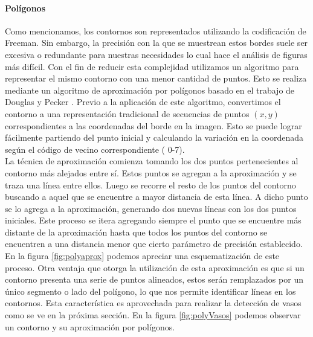 		
	\paragraph{Polígonos}
	Como mencionamos, los contornos son representados utilizando la codificación de Freeman. Sin embargo, la precisión con la que se muestrean estos bordes suele ser excesiva o redundante para nuestras
	necesidades lo cual hace el análisis de figuras más difícil. Con el fin de reducir esta complejidad utilizamos un algoritmo
	para representar el mismo contorno con una menor cantidad de puntos. Esto se realiza mediante un algoritmo de aproximación por polígonos
	basado en el trabajo de Douglas y Pecker \cite{dp74}. Previo a la aplicación de este algoritmo, convertimos el contorno a una representación
	tradicional de secuencias de puntos $(x,y)$ correspondientes a las 
	coordenadas del borde en la imagen. Esto se puede lograr fácilmente partiendo del punto inicial y calculando la variación en la coordenada según el código de vecino correspondiente ( 0-7).\\
	\indent La técnica de aproximación comienza tomando los dos puntos 
	pertenecientes al contorno más alejados entre sí. Estos puntos se 
	agregan a la aproximación y se traza una línea entre ellos.
	Luego se recorre el resto de los puntos del contorno buscando a aquel 
	que se encuentre a mayor distancia de esta línea. A dicho punto se lo 
	agrega a la aproximación, generando dos nuevas líneas con los dos puntos iniciales. Este proceso se itera agregando siempre el punto que se encuentre más distante de la aproximación hasta que todos los puntos del contorno se encuentren a una distancia menor que cierto parámetro 
	de precisión establecido. En la figura \ref{fig:polyaprox} podemos apreciar una esquematización de este proceso. Otra ventaja que 
	otorga la utilización de esta aproximación es que si un contorno presenta una serie de puntos alineados, estos serán remplazados por un 
	único segmento o lado del polígono, lo que nos permite identificar líneas en los contornos. Esta característica es aprovechada para
	realizar la detección de vasos como se ve en la próxima sección. En la figura \ref{fig:polyVasos} podemos observar un contorno
	y su aproximación por polígonos.
	
